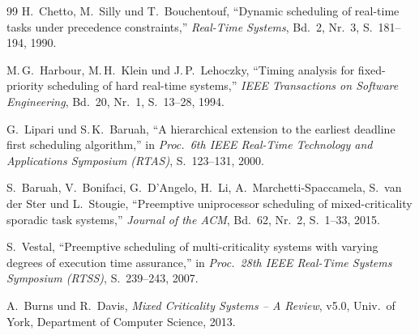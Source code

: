 ﻿\documentclass[a4paper,12pt]{article}
\theoremstyle{definition}
\begin{document}
\begin{thebibliography}{99}
		H.\ Chetto, M.\ Silly und T.\ Bouchentouf,
		``Dynamic scheduling of real-time tasks under precedence constraints,''
		\textit{Real-Time Systems}, Bd.~2, Nr.~3, S.~181--194, 1990.

		M.\,G.\ Harbour, M.\,H.\ Klein und J.\,P.\ Lehoczky,
		``Timing analysis for fixed-priority scheduling of hard real-time systems,''
		\textit{IEEE Transactions on Software Engineering}, Bd.~20, Nr.~1, S.~13--28, 1994.

		G.\ Lipari und S.\,K.\ Baruah,
		``A hierarchical extension to the earliest deadline first scheduling algorithm,''
		in \textit{Proc.\ 6th IEEE Real-Time Technology and Applications Symposium (RTAS)},
		S.~123--131, 2000.

		S.\ Baruah, V.\ Bonifaci, G.\ D'Angelo, H.\ Li, A.\ Marchetti-Spaccamela,
		S.\ van der Ster und L.\ Stougie,
		``Preemptive uniprocessor scheduling of mixed-criticality sporadic task systems,''
		\textit{Journal of the ACM}, Bd.~62, Nr.~2, S.~1--33, 2015.

		S.\ Vestal,
		``Preemptive scheduling of multi-criticality systems with varying degrees of
		execution time assurance,''
		in \textit{Proc.\ 28th IEEE Real-Time Systems Symposium (RTSS)}, S.~239--243, 2007.

		A.\ Burns und R.\ Davis,
		\textit{Mixed Criticality Systems -- A Review},
		v5.0, Univ.\ of York, Department of Computer Science, 2013.

	\end{thebibliography}
	
\end{document}
